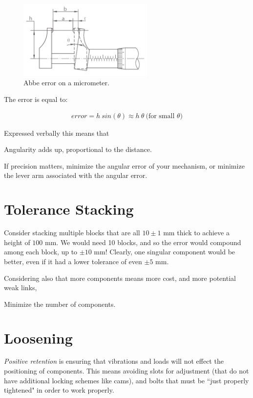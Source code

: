\begin{figure}[H]
	\includegraphics[width=0.6\textwidth]{imgs/abbe_error.png}
	\caption{Abbe error on a micrometer.}
\end{figure}

The error is equal to:

\begin{align}
	error = h \ sin(\theta) \approx h \ \theta \ \mbox{(for small $\theta$)}
\end{align}

Expressed verbally this means that

\begin{theorem} \label{theorem:abbe}
Angularity adds up, proportional to the distance.
\end{theorem}

If precision matters, minimize the angular error of your mechanism, or minimize the lever arm associated with the angular error.


\section{Tolerance Stacking}

Consider stacking multiple blocks that are all $10 \pm 1$ mm thick to achieve a height of $100$ mm. We would need 10 blocks, and so the error would compound among each block, up to $\pm 10$ mm! Clearly, one singular component would be better, even if it had a lower tolerance of even $\pm 5$ mm.

Considering also that more components means more cost, and more potential weak links,

\begin{theorem}
Minimize the number of components.
\end{theorem}

\section{Loosening}

\textit{Positive retention} is ensuring that vibrations and loads will not effect the positioning of components. This means avoiding slots for adjustment (that do not have additional locking schemes like cams), and bolts that must be ``just properly tightened" in order to work properly.


